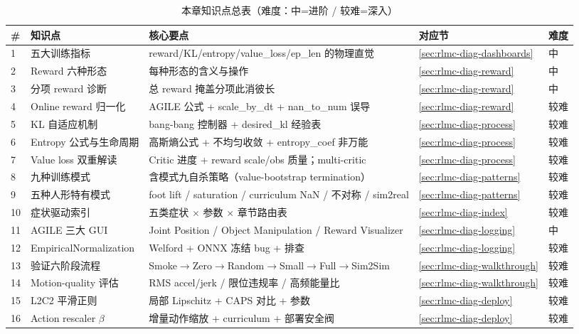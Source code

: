 \begin{table}[H]
\centering
\caption{本章知识点总表（难度：中=进阶 / 较难=深入）}
\label{tab:rlmc-diag-kp}
\begin{tabular}{p{0.7cm}p{4.6cm}p{5.0cm}p{1.8cm}p{1.4cm}}
\hline
\# & 知识点 & 核心要点 & 对应节 & 难度 \\
\hline
1 & 五大训练指标 & reward/KL/entropy/value\_loss/ep\_len 的物理直觉 & \cref{sec:rlmc-diag-dashboards} & 中 \\
2 & Reward 六种形态 & 每种形态的含义与操作 & \cref{sec:rlmc-diag-reward} & 中 \\
3 & 分项 reward 诊断 & 总 reward 掩盖分项此消彼长 & \cref{sec:rlmc-diag-reward} & 中 \\
4 & Online reward 归一化 & AGILE 公式 + scale\_by\_dt + nan\_to\_num 误导 & \cref{sec:rlmc-diag-reward} & 较难 \\
5 & KL 自适应机制 & bang-bang 控制器 + desired\_kl 经验表 & \cref{sec:rlmc-diag-process} & 较难 \\
6 & Entropy 公式与生命周期 & 高斯熵公式 + 不均匀收敛 + entropy\_coef 非万能 & \cref{sec:rlmc-diag-process} & 较难 \\
7 & Value loss 双重解读 & Critic 进度 + reward scale/obs 质量；multi-critic & \cref{sec:rlmc-diag-process} & 较难 \\
8 & 九种训练模式 & 含模式九自杀策略（value-bootstrap termination） & \cref{sec:rlmc-diag-patterns} & 较难 \\
9 & 五种人形特有模式 & foot lift / saturation / curriculum NaN / 不对称 / sim2real & \cref{sec:rlmc-diag-patterns} & 较难 \\
10 & 症状驱动索引 & 五类症状 $\times$ 参数 $\times$ 章节路由表 & \cref{sec:rlmc-diag-index} & 较难 \\
11 & AGILE 三大 GUI & Joint Position / Object Manipulation / Reward Visualizer & \cref{sec:rlmc-diag-logging} & 中 \\
12 & EmpiricalNormalization & Welford + ONNX 冻结 bug + 排查 & \cref{sec:rlmc-diag-logging} & 较难 \\
13 & 验证六阶段流程 & Smoke$\to$Zero$\to$Random$\to$Small$\to$Full$\to$Sim2Sim & \cref{sec:rlmc-diag-walkthrough} & 较难 \\
14 & Motion-quality 评估 & RMS accel/jerk / 限位违规率 / 高频能量比 & \cref{sec:rlmc-diag-walkthrough} & 较难 \\
15 & L2C2 平滑正则 & 局部 Lipschitz + CAPS 对比 + 参数 & \cref{sec:rlmc-diag-deploy} & 较难 \\
16 & Action rescaler $\beta$ & 增量动作缩放 + curriculum + 部署安全阀 & \cref{sec:rlmc-diag-deploy} & 较难 \\

\end{tabular}
\end{table}
